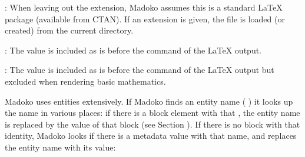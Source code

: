 \documentclass{book}
\begin{document}
\begin{mdUl}[class={list-star,loose},data-line={2323}]
\begin{mdLi}[data-line={2334}]
\begin{mdDiv}[class={madokonet},elem={madokonet},background-color={Gainsboro},data-line={2354}]
\begin{mdP}[data-line={2355}]
{}%
{}:   When leaving out the extension, Madoko assumes this
  is a standard LaTeX package (available from CTAN). If an extension
  is given, the file is loaded (or created) from the current directory.%
\end{mdP}%
\end{mdDiv}%
\end{mdLi}%
\begin{mdLi}[data-line={2360}]%
\begin{mdP}[data-line={2360}]%
{}%
{}: The value is included as is before
  the %
{}%
{} command of the LaTeX output.%
\end{mdP}%
\end{mdLi}%
\begin{mdLi}[data-line={2363}]%
\begin{mdP}[data-line={2363}]%
{}%
{}: The value is included as is before
  the %
{}%
{} command of the LaTeX output but excluded
  when rendering basic mathematics. %
{} %
{}%
\end{mdP}%
\end{mdLi}%
\end{mdUl}%
\begin{mdP}[data-line={2370}]%
{}Madoko uses entities extensively. If Madoko finds an entity name (%
{}\mdCode[class={code,code1}]{{\&}}%
{}%
{}\mdCode[class={code,code1}]{;}%
{})
it looks up the name in various places: if there is a block
element with that %
{}%
{}, the entity name is replaced by the %
{}%
{} value of that block
(see Section%
{}{\mdNbsp}%
{}). If there is no block with that identity, 
Madoko looks if there is a metadata value with that name, and replaces the
entity name with its value:%
\end{mdP}%
\end{document}
